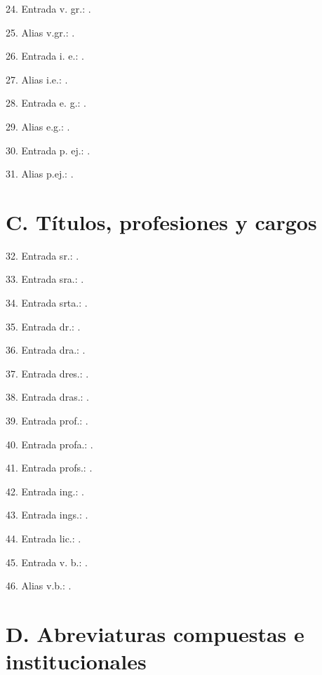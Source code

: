 \documentclass{article}
\begin{document}
24. Entrada v. gr.: .

25. Alias v.gr.: .

26. Entrada i. e.: .

27. Alias i.e.: .

28. Entrada e. g.: .

29. Alias e.g.: .

30. Entrada p. ej.: .

31. Alias p.ej.: .

\section*{C. Títulos, profesiones y cargos}

32. Entrada sr.: .

33. Entrada sra.: .

34. Entrada srta.: .

35. Entrada dr.: .

36. Entrada dra.: .

37. Entrada dres.: .

38. Entrada dras.: .

39. Entrada prof.: .

40. Entrada profa.: .

41. Entrada profs.: .

42. Entrada ing.: .

43. Entrada ings.: .

44. Entrada lic.: .

45. Entrada v. b.: .

46. Alias v.b.: .

\section*{D. Abreviaturas compuestas e institucionales}
\end{document}
